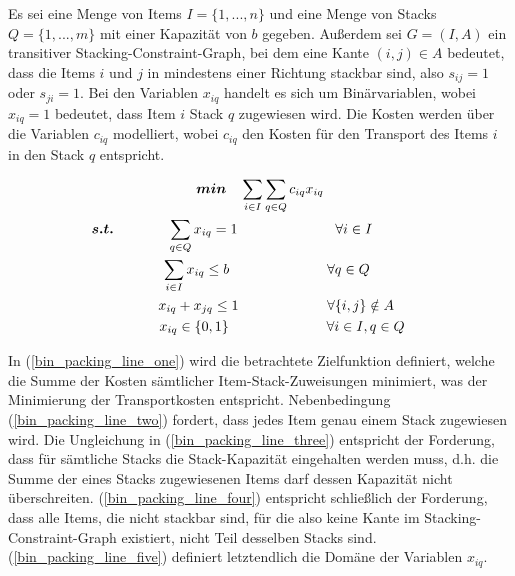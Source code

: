 Es sei eine Menge von Items $I = \{1, ..., n\}$ und eine Menge von Stacks $Q = \{1, ..., m\}$ mit einer Kapazität von $b$ gegeben.
Außerdem sei $G = (I, A)$ ein transitiver Stacking-Constraint-Graph, bei dem eine Kante $(i, j) \in A$ bedeutet,
dass die Items $i$ und $j$ in mindestens einer Richtung stackbar sind, also $s_{ij} = 1$ oder $s_{ji} = 1$.\newline
Bei den Variablen $x_{iq}$ handelt es sich um Binärvariablen, wobei $x_{iq} = 1$ bedeutet, dass Item $i$ Stack $q$ zugewiesen wird.
Die Kosten werden über die Variablen $c_{iq}$ modelliert, wobei $c_{iq}$ den Kosten für den Transport des Items $i$ in den Stack $q$
entspricht.

\begin{gather}
\boldsymbol{min} \quad \sum_{i \in I} \sum_{q \in Q} c_{iq} x_{iq} \label{bin_packing_line_one} \\
\thinspace\thinspace \boldsymbol{s.t.} \thinspace\quad\thinspace\thinspace\thinspace\quad\thinspace \quad \sum_{q \in Q} x_{iq} = 1 \quad\quad\quad\quad\quad\quad\quad \forall i \in I \quad\quad\quad\quad\thinspace\thinspace \label{bin_packing_line_two} \\
\quad \sum_{i \in I} x_{iq} \leq b \quad\quad\quad\quad\quad\quad\quad \forall q \in Q \label{bin_packing_line_three} \\
\thinspace\thinspace\quad\quad x_{iq} + x_{jq} \leq 1 \quad\quad\thinspace\thinspace\quad\quad\quad\quad \forall \{i, j\} \notin A \label{bin_packing_line_four} \\
\thinspace\thinspace\quad\quad\quad x_{iq} \in \{0, 1\} \thinspace\thinspace\thinspace\thinspace\thinspace\thinspace\quad\quad\quad\quad\quad\quad \forall i \in I, q \in Q \thinspace \label{bin_packing_line_five}
\end{gather}

In (\ref{bin_packing_line_one}) wird die betrachtete Zielfunktion definiert, welche die Summe der Kosten sämtlicher
Item-Stack-Zuweisungen minimiert, was der Minimierung der Transportkosten entspricht.
Nebenbedingung (\ref{bin_packing_line_two}) fordert, dass jedes Item genau einem Stack zugewiesen wird. Die Ungleichung in (\ref{bin_packing_line_three}) entspricht der Forderung, dass für sämtliche Stacks die Stack-Kapazität eingehalten werden muss, d.h.
die Summe der eines Stacks zugewiesenen Items darf dessen Kapazität nicht überschreiten. (\ref{bin_packing_line_four}) entspricht schließlich der Forderung, dass alle Items, die nicht stackbar sind, für die also keine Kante im Stacking-Constraint-Graph existiert, nicht Teil desselben Stacks sind. (\ref{bin_packing_line_five}) definiert letztendlich die Domäne der Variablen $x_{iq}$.

